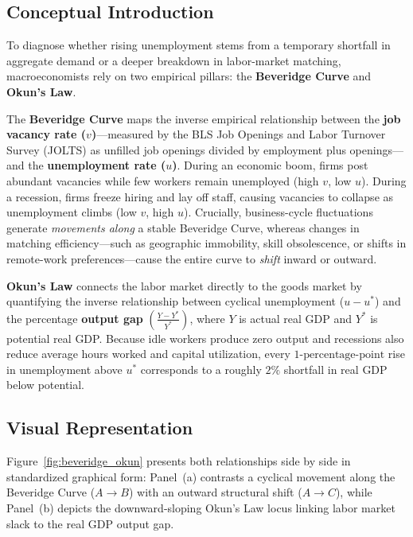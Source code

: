 \documentclass[11pt, a4paper]{article}
\begin{document}
\subsection*{Conceptual Introduction}
To diagnose whether rising unemployment stems from a temporary shortfall in aggregate demand or a deeper breakdown in labor-market matching, macroeconomists rely on two empirical pillars: the \textbf{Beveridge Curve} and \textbf{Okun's Law}.

The \textbf{Beveridge Curve} maps the inverse empirical relationship between the \textbf{job vacancy rate ($v$)}—measured by the BLS Job Openings and Labor Turnover Survey (JOLTS) as unfilled job openings divided by employment plus openings—and the \textbf{unemployment rate ($u$)}. During an economic boom, firms post abundant vacancies while few workers remain unemployed (high $v$, low $u$). During a recession, firms freeze hiring and lay off staff, causing vacancies to collapse as unemployment climbs (low $v$, high $u$). Crucially, business-cycle fluctuations generate \textit{movements along} a stable Beveridge Curve, whereas changes in matching efficiency—such as geographic immobility, skill obsolescence, or shifts in remote-work preferences—cause the entire curve to \textit{shift} inward or outward.

\textbf{Okun's Law} connects the labor market directly to the goods market by quantifying the inverse relationship between cyclical unemployment ($u - u^*$) and the percentage \textbf{output gap} $\left(\frac{Y - Y^*}{Y^*}\right)$, where $Y$ is actual real GDP and $Y^*$ is potential real GDP. Because idle workers produce zero output and recessions also reduce average hours worked and capital utilization, every $1\text{-percentage-point}$ rise in unemployment above $u^*$ corresponds to a roughly $2\%$ shortfall in real GDP below potential.

\subsection*{Visual Representation}
Figure~\ref{fig:beveridge_okun} presents both relationships side by side in standardized graphical form: Panel~(a) contrasts a cyclical movement along the Beveridge Curve ($A \to B$) with an outward structural shift ($A \to C$), while Panel~(b) depicts the downward-sloping Okun's Law locus linking labor market slack to the real GDP output gap.
\end{document}
